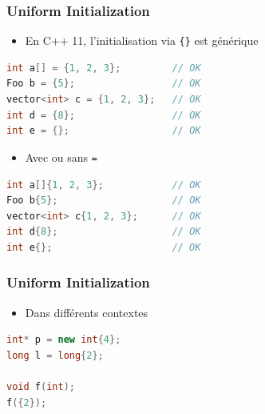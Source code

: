 \documentclass[C++.tex]{subfiles}
\begin{document}
\begin{frame}[fragile]
	\frametitle{Uniform Initialization}
	\begin{itemize}
		\item En C++ 11, l'initialisation via \lstinline|{}| est générique
	\end{itemize}

	\begin{lstlisting}[language=C++]
int a[] = {1, 2, 3};         // OK
Foo b = {5};                 // OK
vector<int> c = {1, 2, 3};   // OK
int d = {8};                 // OK
int e = {};                  // OK\end{lstlisting}

	\pause

	\begin{itemize}
		\item Avec ou sans \lstinline|=|
	\end{itemize}

	\begin{lstlisting}[language=C++]
int a[]{1, 2, 3};            // OK
Foo b{5};                    // OK
vector<int> c{1, 2, 3};      // OK
int d{8};                    // OK
int e{};                     // OK\end{lstlisting}
\end{frame}

\begin{frame}[fragile]
	\frametitle{Uniform Initialization}
	\begin{itemize}
		\item Dans différents contextes
	\end{itemize}

	\begin{lstlisting}[language=C++]
int* p = new int{4};
long l = long{2};

void f(int);
f({2});\end{lstlisting}
\end{frame}
\end{document}
